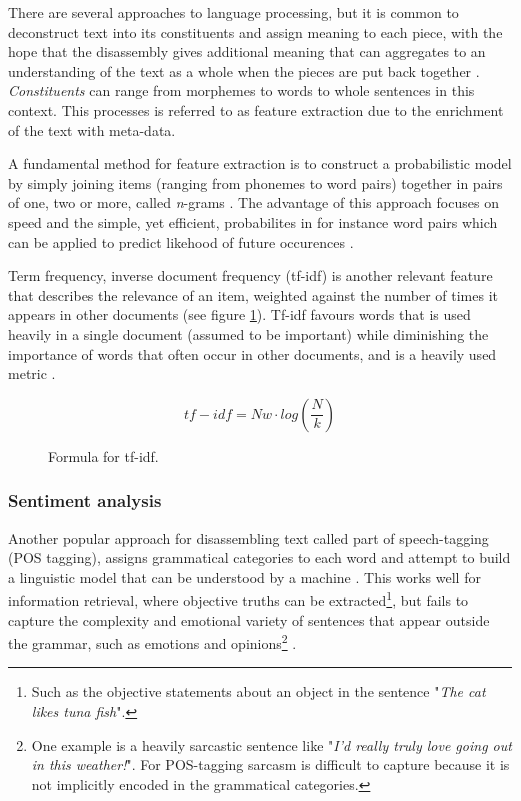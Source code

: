 \documentclass[a4paper]{article}
\begin{document}
There are several approaches to language processing, but it is common
to deconstruct text into its constituents and assign meaning
to each piece, with the hope that the disassembly gives additional meaning
that can aggregates to an understanding of the text as a whole when the pieces
are put back together \citep{Jurafsky2000}.
\textit{Constituents} can range from morphemes to words to whole sentences in
this context. This processes is referred to as feature extraction due to the
enrichment of the text with meta-data.

A fundamental method for feature extraction is to construct a probabilistic
model by simply joining items (ranging from phonemes to word pairs) together
in pairs of one, two or more, called \textit{n}-grams \citep{Jurafsky2000}.
The advantage of this approach focuses on speed and the simple, yet efficient,
probabilites in for instance word pairs which can be applied to predict
likehood of future occurences \citep{Jurafsky2000}.

Term frequency, inverse document frequency (tf-idf) is another relevant feature
that describes the relevance of an item, weighted against the number of
times it appears in other documents \citep{Jurafsky2000} (see figure \ref{fig:tfidf}).
Tf-idf favours words that is used heavily in a
single document (assumed to be important) while diminishing the importance of
words that often occur in other documents, and is a heavily used metric \citep{Jurafsky2000}.

\begin{figure}
\[tf-idf = Nw \cdot log(\frac{N}{k})\]
\caption{Formula for tf-idf.}
\label{fig:tfidf}
\end{figure}

\subsubsection{Sentiment analysis}
Another popular approach for disassembling text
called part of speech-tagging (POS tagging), assigns grammatical categories
to each word and attempt to build a linguistic model that can be understood by
a machine \citep{Jurafsky2000}. This works well for information retrieval,
where objective truths can be extracted\footnote{Such as the objective statements about an object in the
sentence "\textit{The cat likes tuna fish}".}, but fails
to capture the complexity and emotional variety of sentences that appear
outside the grammar, such as emotions and opinions\footnote{One example is a heavily sarcastic sentence like
"\textit{I'd really truly love going out in this weather!}". For POS-tagging
sarcasm is difficult to capture because it is not implicitly encoded in the
grammatical categories.} \citep{Jurafsky2000}.
\end{document}
